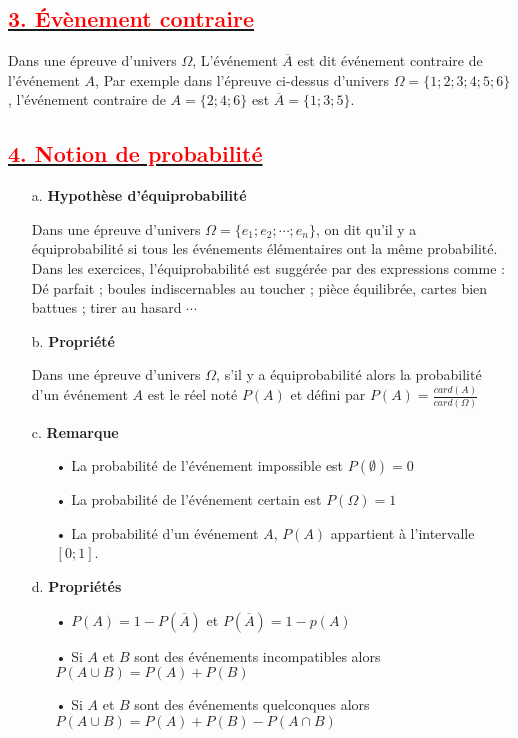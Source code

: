 \documentclass[12pt]{article}
\begin{document}
\subsection*{\underline{\textbf{\textcolor{red}{3. Évènement contraire}}}}
Dans une épreuve d’univers $\Omega$, L’événement $\overline{A}$ est dit événement contraire de l’événement $A$, Par exemple dans 
l’épreuve ci-dessus d’univers $\Omega = \lbrace1; 2; 3; 4; 5; 6\rbrace$, l’événement contraire de 
$A = \lbrace2; 4; 6\rbrace$ est $\overline{A}= \lbrace1; 3; 5\rbrace.$
\subsection*{\underline{\textbf{\textcolor{red}{4. Notion de probabilité}}}}
\begin{enumerate}
\item[a.]\textbf{Hypothèse d’équiprobabilité}

Dans une épreuve d’univers $\Omega =\lbrace e_{1}; e_{2}; \cdots ; e_{n}\rbrace$, on dit qu’il y a\\ équiprobabilité si tous les événements élémentaires ont la même probabilité. Dans les exercices, l’équiprobabilité est suggérée par des expressions comme : Dé parfait ; boules indiscernables au toucher ; pièce équilibrée, cartes bien battues ; tirer au hasard $\cdots$
\item[b.]\textbf{Propriété}

Dans une épreuve d’univers $\Omega$, s’il y a équiprobabilité alors la probabilité d’un événement $A$ est le réel noté $P(A)$ et défini par $P(A)=\frac{card(A)}{card(\Omega)}$
\item[c.]\textbf{Remarque}
\begin{itemize}
\item[•] La probabilité de l’événement impossible est $P(\emptyset) = 0$
\item[•] La probabilité de l’événement certain est $P(\Omega)=1$
\item[•] La probabilité d’un événement $A$, $P(A)$ appartient à l’intervalle $[0; 1]$.
\end{itemize}
\item[d.]\textbf{Propriétés}
\begin{itemize}
\item[•] $P(A) =1-P(\overline{A})$ et $P(\overline{A}) =1-p(A)$
\item[•]  Si $A$ et $B$ sont des événements incompatibles alors\\ $P(A \cup B) = P(A) + P(B)$
\item[•]  Si $A$ et $B$ sont des événements quelconques alors\\ $P(A \cup B) = P(A) + P(B) - P(A \cap B)$
\end{itemize}
\end{enumerate}
\end{document}
